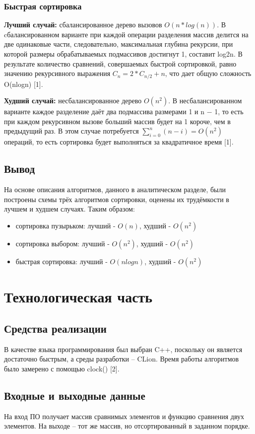 \documentclass{report}
\begin{document}
\subsection{Быстрая сортировка}
\textbf{Лучший случай:} сбалансированное дерево вызовов \(O(n*log(n))\). 
В cбалансированном варианте при каждой операции разделения массив делится на две одинаковые части, следовательно, максимальная глубина рекурсии, при которой размеры обрабатываемых подмассивов достигнут 1, составит log2n. В результате количество сравнений, совершаемых быстрой сортировкой, равно значению рекурсивного выражения $C_n = 2 * C_{n / 2} + n$, что дает общую сложность O(nlogn) [1].

\textbf{Худший случай:} несбалансированное дерево $O(n^2)$.
В несбалансированном варианте каждое разделение даёт два подмассива размерами 1 и n − 1, то есть при каждом рекурсивном вызове больший массив будет на 1 короче, чем в предыдущий раз. В этом случае потребуется $\sum_{{i=0}}^{n}(n-i)=O(n^{2})$ операций, то есть сортировка будет выполняться за квадратичное время [1].
\section{Вывод}
На основе описания алгоритмов, данного в аналитическом разделе, были построены схемы трёх алгоритмов сортировки, оценены их трудёмкости в лучшем и худшем случаях. Таким образом:
\begin{itemize}
\item сортировка пузырьком: лучший - $O(n)$, худший - $O(n^2)$ 
\item сортировка выбором: лучший - $O(n^2)$, худший - $O(n^2)$ 
\item быстрая сортировка: лучший - $O(nlogn)$, худший - $O(n^2)$ 
\end{itemize}
\chapter{Технологическая часть}

\section{Средства реализации}

В качестве языка программирования был выбран C++, поскольку он является достаточно быстрым, а среды разработки -- CLion. Время работы алгоритмов было замерено с помощью clock() [2].

\section{Входные и выходные данные}
На вход ПО получает массив сравнимых элементов и функцию сравнения двух элементов. На выходе -- тот же массив, но отсортированный в заданном порядке.
\end{document}

